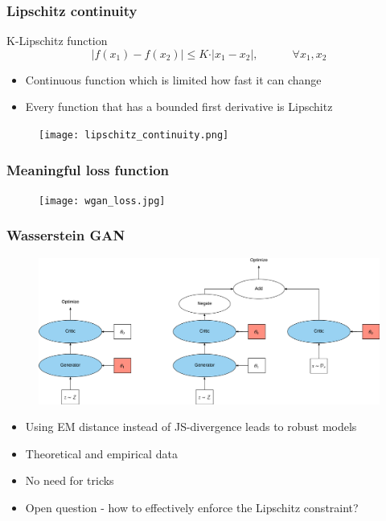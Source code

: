\documentclass{Bredelebeamer}
\begin{document}
\begin{frame}
	\frametitle{Lipschitz continuity}
	\begin{exampleblock}{K-Lipschitz function}
	\[
		\vert f(x_1) - f(x_2) \vert \leq K \cdot \vert x_1 - x_2 \vert, \quad \quad \quad \forall x_1, x_2
	\]
	\end{exampleblock}
	\begin{itemize}
		\item Continuous function which is limited how fast it can change
		\item Every function that has a bounded first derivative is Lipschitz
	\end{itemize}
	\begin{figure}[h!]
		\centering
		\texttt{[image: lipschitz\_continuity.png]}
	\end{figure}

\end{frame}


\begin{frame}
	\frametitle{Meaningful loss function}
	\begin{figure}[h!]
		\centering
		\texttt{[image: wgan\_loss.jpg]}
	\end{figure}
\end{frame}

\begin{frame}
	\frametitle{Wasserstein GAN}
	\begin{figure}[h!]
	\centering
	\includegraphics[width=\textwidth]{GAN_optimization_two_step.png}
	\end{figure}
	\begin{itemize}
		\item Using EM distance instead of JS-divergence leads to robust models
		\item Theoretical and empirical data
		\item No need for tricks 
		\pause
		\item Open question - how to effectively enforce the Lipschitz constraint?
	\end{itemize}
\end{frame}
\end{document}
